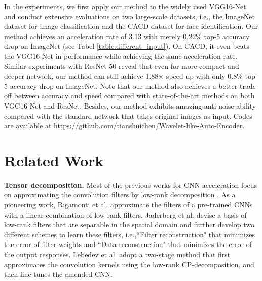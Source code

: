 \documentclass[letterpaper]{article} %
\begin{document}
In the experiments, we first apply our method to the widely used VGG16-Net and conduct extensive evaluations on two large-scale datasets, i.e., the ImageNet dataset for image classification and the CACD dataset for face identification. Our method achieves an acceleration rate of 3.13 with merely 0.22\% top-5 accuracy drop on ImageNet (see Tabel \ref{table:different_input}). On CACD, it even beats the VGG16-Net in performance while achieving the same acceleration rate. Similar experiments with ResNet-50 reveal that even for more compact and deeper network, our method can still achieve 1.88$\times$ speed-up with only 0.8\% top-5 accuracy drop on ImageNet. Note that our method also achieves a better trade-off between accuracy and speed compared with state-of-the-art methods on both VGG16-Net and ResNet. Besides, our method exhibits amazing anti-noise ability compared with the standard network that takes original images as input. Codes are available at \url{https://github.com/tianshuichen/Wavelet-like-Auto-Encoder}.

\section{Related Work}
\noindent\textbf{Tensor decomposition. }Most of the previous works for CNN acceleration focus on approximating the convolution filters by low-rank decomposition \cite{rigamonti2013learning,jaderberg2014speeding,lebedev2014speeding,tai2015convolutional}. As a pioneering work, Rigamonti et al. \cite{rigamonti2013learning} approximate the filters of a pre-trained CNNs with a linear combination of low-rank filters. Jaderberg et al. \cite{jaderberg2014speeding} devise a basis of low-rank filters that are separable in the spatial domain and further develop two different schemes to learn these filters, i.e.,``Filter reconstruction" that minimizes the error of filter weights and ``Data reconstruction" that minimizes the error of the output responses. Lebedev et al. \cite{lebedev2014speeding} adopt a two-stage method that first approximates the convolution kernels using the low-rank CP-decomposition, and then fine-tunes the amended CNN.
\end{document}
